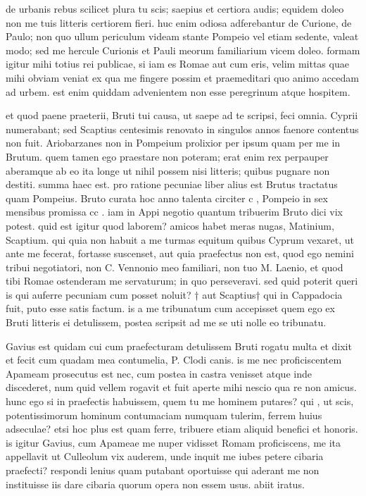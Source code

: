  de urbanis rebus scilicet plura tu scis; saepius et certiora audis; equidem doleo non me tuis litteris certiorem fieri. huc enim odiosa adferebantur de Curione, de Paulo; non quo ullum periculum videam stante Pompeio vel etiam sedente, valeat modo; sed me hercule Curionis et Pauli meorum familiarium vicem doleo. formam igitur mihi totius rei publicae, si iam es Romae aut cum eris, velim mittas quae mihi obviam veniat ex qua me fingere possim et praemeditari quo animo accedam ad urbem. est enim quiddam advenientem non esse peregrinum atque hospitem.

 et quod paene praeterii, Bruti tui causa, ut saepe ad te scripsi, feci omnia. Cyprii numerabant; sed Scaptius centesimis renovato in singulos annos faenore contentus non fuit. Ariobarzanes non in Pompeium prolixior per ipsum quam per me in Brutum. quem tamen ego praestare non poteram; erat enim rex perpauper aberamque ab eo ita longe ut nihil possem nisi litteris; quibus pugnare non destiti. summa haec est. pro ratione pecuniae liber alius est Brutus tractatus quam Pompeius. Bruto curata hoc anno talenta circiter c , Pompeio in sex mensibus promissa cc . iam in Appi negotio quantum tribuerim Bruto dici vix potest. quid est igitur quod laborem? amicos habet meras nugas, Matinium, Scaptium. qui quia non habuit a me turmas equitum quibus Cyprum vexaret, ut ante me fecerat, fortasse suscenset, aut quia praefectus non est, quod ego nemini tribui negotiatori, non C. Vennonio meo familiari, non tuo M. Laenio, et quod tibi Romae ostenderam me servaturum; in quo perseveravi. sed quid poterit queri is qui auferre pecuniam cum posset noluit? † aut Scaptius† qui in Cappadocia fuit, puto esse satis factum. is a me tribunatum cum accepisset quem ego ex Bruti litteris ei detulissem, postea scripsit ad me se uti nolle eo tribunatu.

 Gavius est quidam cui cum praefecturam detulissem Bruti rogatu multa et dixit et fecit cum quadam mea contumelia, P. Clodi canis. is me nec proficiscentem Apameam prosecutus est nec, cum postea in castra venisset atque inde discederet, num quid vellem rogavit et fuit aperte mihi nescio qua re non amicus. hunc ego si in praefectis habuissem, quem tu me hominem putares? qui , ut scis, potentissimorum hominum contumaciam numquam tulerim, ferrem huius adseculae? etsi hoc plus est quam ferre, tribuere etiam aliquid benefici et honoris. is igitur Gavius, cum Apameae me nuper vidisset Romam proficiscens, me ita appellavit ut Culleolum vix auderem, unde inquit me iubes petere cibaria praefecti? respondi lenius quam putabant oportuisse qui aderant me non instituisse iis dare cibaria quorum opera non essem usus. abiit iratus.

